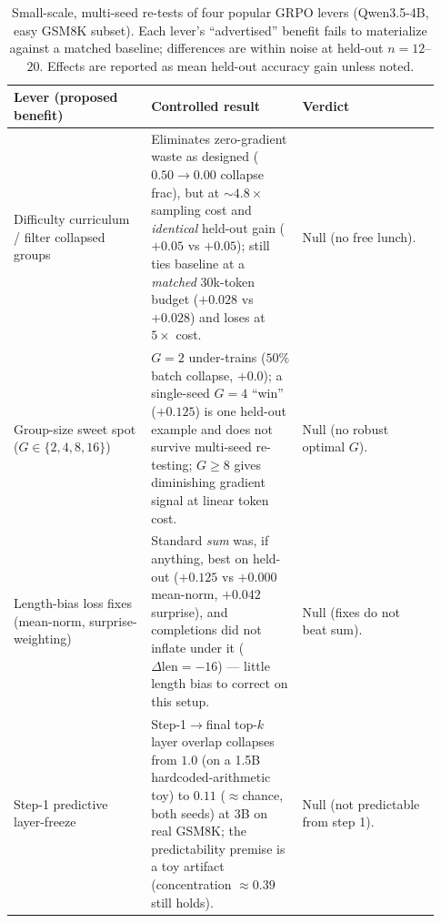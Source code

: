 \documentclass{article}
\begin{document}
\begin{table}[t]
  \centering
  \small
  \caption{Small-scale, multi-seed re-tests of four popular GRPO levers
  (Qwen3.5-4B, easy GSM8K subset). Each lever's ``advertised'' benefit
  fails to materialize against a matched baseline; differences are
  within noise at held-out $n{=}12$--$20$. Effects are reported as
  mean held-out accuracy gain unless noted.}
  \label{tab:smallscale-nulls}
  \begin{tabular}{@{}p{0.30\linewidth}p{0.33\linewidth}p{0.30\linewidth}@{}}
    \toprule
    \textbf{Lever (proposed benefit)} & \textbf{Controlled result} & \textbf{Verdict} \\
    \midrule
    Difficulty curriculum / filter collapsed groups
      & Eliminates zero-gradient waste as designed ($0.50{\to}0.00$
        collapse frac), but at ${\sim}4.8\times$ sampling cost and
        \emph{identical} held-out gain ($+0.05$ vs $+0.05$); still ties
        baseline at a \emph{matched} $30$k-token budget ($+0.028$ vs
        $+0.028$) and loses at $5\times$ cost.
      & Null (no free lunch). \\
    \addlinespace
    Group-size sweet spot ($G\in\{2,4,8,16\}$)
      & $G{=}2$ under-trains ($50\%$ batch collapse, $+0.0$); a
        single-seed $G{=}4$ ``win'' ($+0.125$) is one held-out example
        and does not survive multi-seed re-testing; $G{\geq}8$ gives
        diminishing gradient signal at linear token cost.
      & Null (no robust optimal $G$). \\
    \addlinespace
    Length-bias loss fixes (mean-norm, surprise-weighting)
      & Standard \emph{sum} was, if anything, best on held-out ($+0.125$
        vs $+0.000$ mean-norm, $+0.042$ surprise), and completions did
        not inflate under it ($\Delta\text{len}{=}-16$) --- little
        length bias to correct on this setup.
      & Null (fixes do not beat sum). \\
    \addlinespace
    Step-1 predictive layer-freeze
      & Step-1$\to$final top-$k$ layer overlap collapses from $1.0$ (on
        a 1.5B hardcoded-arithmetic toy) to $0.11$ ($\approx$chance,
        both seeds) at 3B on real GSM8K; the predictability premise is a
        toy artifact (concentration $\approx0.39$ still holds).
      & Null (not predictable from step 1). \\
    \bottomrule
  \end{tabular}
\end{table}
\end{document}
